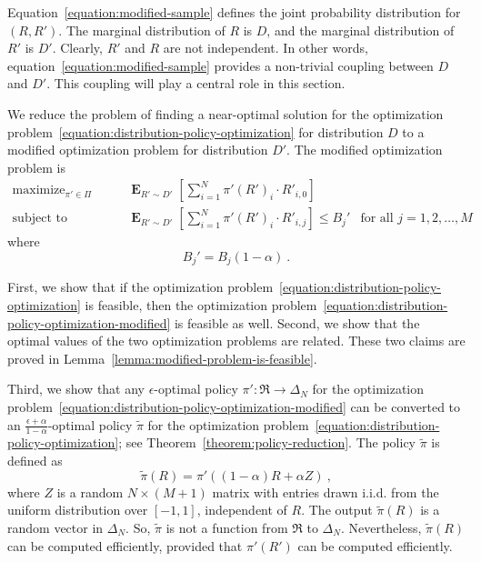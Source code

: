 \documentclass[12pt]{article}
\newcommand{\Requests}{\mathfrak{R}}
\DeclareMathOperator*{\Exp}{\mathbf{E}}
\DeclareMathOperator*{\maximize}{maximize}
\DeclareMathOperator*{\subjectto}{subject\ to}
\theoremstyle{definition}
\begin{document}
Equation~\eqref{equation:modified-sample} defines the joint probability
distribution for $(R,R')$. The marginal distribution of $R$ is $D$, and the
marginal distribution of $R'$ is $D'$. Clearly, $R'$ and $R$ are not
independent. In other words, equation~\eqref{equation:modified-sample}
provides a non-trivial coupling between $D$ and $D'$. This coupling will play a
central role in this section.

We reduce the problem of finding a near-optimal solution for the
optimization problem~\eqref{equation:distribution-policy-optimization} for distribution
$D$ to a modified optimization problem for distribution $D'$. The modified
optimization problem is
\begin{equation}
\label{equation:distribution-policy-optimization-modified}
\begin{aligned}
\maximize_{\pi' \in \Pi} \qquad & \Exp_{R' \sim D'} \left[ \sum_{i=1}^N \pi'(R')_i \cdot R'_{i,0} \right] \\
\subjectto \qquad & \Exp_{R' \sim D'} \left[ \sum_{i=1}^N \pi'(R')_i \cdot R'_{i,j} \right] \le B_j' & \text{for all $j=1,2,\dots,M$}
\end{aligned}
\end{equation}
where
$$
B_j' = B_j(1 - \alpha) \: .
$$

First, we show that if the optimization
problem~\eqref{equation:distribution-policy-optimization} is feasible, then the
optimization problem~\eqref{equation:distribution-policy-optimization-modified}
is feasible as well. Second, we show that the optimal values of the two
optimization problems are related. These two claims are proved in
Lemma~\ref{lemma:modified-problem-is-feasible}.

Third, we show that any $\epsilon$-optimal policy $\pi':\Requests \to \Delta_N$
for the optimization
problem~\eqref{equation:distribution-policy-optimization-modified} can be
converted to an $\frac{\epsilon + \alpha}{1-\alpha}$-optimal policy
$\widetilde{\pi}$ for the optimization
problem~\eqref{equation:distribution-policy-optimization}; see
Theorem~\ref{theorem:policy-reduction}. The policy $\widetilde{\pi}$ is defined
as
$$
\widetilde{\pi}(R) = \pi'((1-\alpha)R + \alpha Z) \: ,
$$
where $Z$ is a random $N \times (M+1)$ matrix with entries drawn i.i.d. from the
uniform distribution over $[-1,1]$, independent of $R$. The output
$\widetilde{\pi}(R)$ is a random vector in $\Delta_N$. So, $\widetilde{\pi}$ is
not a function from $\Requests$ to $\Delta_N$. Nevertheless,
$\widetilde{\pi}(R)$ can be computed efficiently, provided that $\pi'(R')$ can
be computed efficiently.
\end{document}
